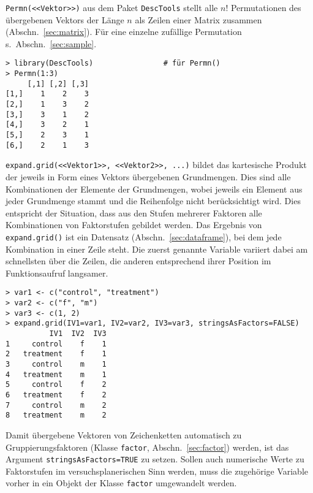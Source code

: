 \lstinline!Permn(<<Vektor>>)! aus dem Paket \lstinline!DescTools! stellt alle $n!$ Permutationen des übergebenen Vektors der Länge $n$ als Zeilen einer Matrix zusammen (Abschn.\ \ref{sec:matrix}). Für eine einzelne zufällige Permutation s.\ Abschn.\ \ref{sec:sample}.
\begin{lstlisting}
> library(DescTools)                # für Permn()
> Permn(1:3)
     [,1] [,2] [,3]
[1,]    1    2    3
[2,]    1    3    2
[3,]    3    1    2
[4,]    3    2    1
[5,]    2    3    1
[6,]    2    1    3
\end{lstlisting}

\lstinline!expand.grid(<<Vektor1>>, <<Vektor2>>, ...)! bildet das kartesische Produkt der jeweils in Form eines Vektors übergebenen Grundmengen. Dies sind alle Kombinationen der Elemente der Grundmengen, wobei jeweils ein Element aus jeder Grundmenge stammt und die Reihenfolge nicht berücksichtigt wird. Dies entspricht der Situation, dass aus den Stufen mehrerer Faktoren alle Kombinationen von Faktorstufen gebildet werden. Das Ergebnis von \lstinline!expand.grid()! ist ein Datensatz (Abschn.\ \ref{sec:dataframe}), bei dem jede Kombination in einer Zeile steht. Die zuerst genannte Variable variiert dabei am schnellsten über die Zeilen, die anderen entsprechend ihrer Position im Funktionsaufruf langsamer.
\begin{lstlisting}
> var1 <- c("control", "treatment")
> var2 <- c("f", "m")
> var3 <- c(1, 2)
> expand.grid(IV1=var1, IV2=var2, IV3=var3, stringsAsFactors=FALSE)
          IV1  IV2  IV3
1     control    f    1
2   treatment    f    1
3     control    m    1
4   treatment    m    1
5     control    f    2
6   treatment    f    2
7     control    m    2
8   treatment    m    2
\end{lstlisting}

Damit übergebene Vektoren von Zeichenketten automatisch zu Gruppierungsfaktoren (Klasse \lstinline!factor!, Abschn.\ \ref{sec:factor}) werden, ist das Argument \lstinline!stringsAsFactors=TRUE! zu setzen. Sollen auch numerische Werte zu Faktorstufen im versuchsplanerischen Sinn werden, muss die zugehörige Variable vorher in ein Objekt der Klasse \lstinline!factor! umgewandelt werden.

